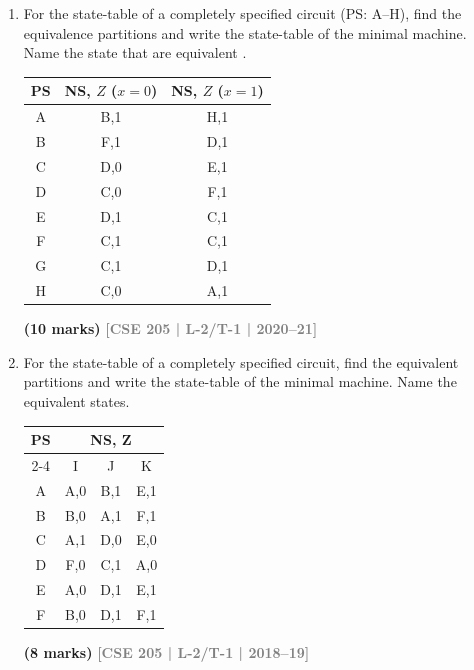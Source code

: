 \documentclass[12pt,a3paper]{article}
\newcommand{\yr}[1]{\hfill\textcolor{gray}{\small\textbf{[#1]}}}
\newcommand{\mk}[1]{\textcolor{orange!70!black}{\small\textbf{(#1 marks)}}}
\begin{document}
\label{sub:s6-state-min}

\begin{enumerate}

\item For the state-table of a completely specified circuit (PS: A--H), find the equivalence partitions and write the state-table of the minimal machine. Name the state that are equivalent .
\par\smallskip
\begin{center}
  
\begin{tabular}{c|cc}
\toprule
PS & NS, $Z$ ($x=0$) & NS, $Z$ ($x=1$)\\
\midrule
A & B,1 & H,1 \\ B & F,1 & D,1 \\ C & D,0 & E,1 \\ D & C,0 & F,1 \\
E & D,1 & C,1 \\ F & C,1 & C,1 \\ G & C,1 & D,1 \\ H & C,0 & A,1 \\
\bottomrule
\end{tabular}
\end{center}
\mk{10} \yr{CSE 205 | L-2/T-1 | 2020--21}

\item For the state-table of a completely specified circuit, find the equivalent partitions and write the state-table of the minimal machine. Name the equivalent states.

\begin{center}
  \begin{tabular}{|c|c|c|c|}
\hline
\multirow{2}{*}{PS} & \multicolumn{3}{c|}{NS, Z} \\ \cline{2-4} 
 & I & J & K \\ \hline
A & A,0 & B,1 & E,1 \\ \hline
B & B,0 & A,1 & F,1 \\ \hline
C & A,1 & D,0 & E,0 \\ \hline
D & F,0 & C,1 & A,0 \\ \hline
E & A,0 & D,1 & E,1 \\ \hline
F & B,0 & D,1 & F,1 \\ \hline
\end{tabular}
\end{center}

\mk{8} \yr{CSE 205 | L-2/T-1 | 2018--19}


\end{enumerate}
\end{document}
